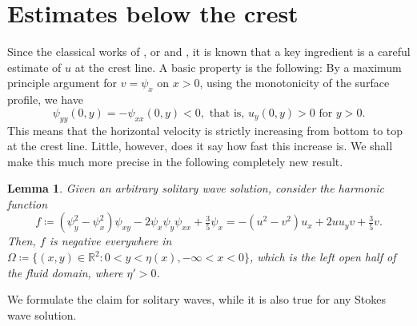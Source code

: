 \documentclass{amsart}
\newtheorem{lemma}[theorem]{Lemma}
\theoremstyle{definition}
\newcommand{\R}{\mathbb R}
\begin{document}
\section{Estimates below the crest}\label{sec:slope}
Since the classical works of \cite{Starr47}, or \cite{kp} and \cite{Long56}, it is known that a key ingredient is a careful estimate of $u$ at the crest line. A basic property is the following: By a maximum principle argument for $v=\psi_x$ on $x>0$, using the monotonicity of the surface profile, we have
\[\psi_{yy}(0,y) = -\psi_{xx}(0,y)<0,\text{ that is, }u_y(0,y)>0\text{ for }y>0.\]
This means that the horizontal velocity is strictly increasing from bottom to top at the crest line. Little, however, does it say how fast this increase is. We shall make this much more precise in the following completely new result.

\begin{lemma} \label{thm:slope}
	Given an arbitrary solitary wave solution, consider the harmonic function 
	\[
	f \coloneqq (\psi_y^2-\psi_x^2)\psi_{xy}-2\psi_x\psi_y\psi_{xx}+\tfrac35\psi_x = -(u^2-v^2)u_x+2u u_y v+\tfrac35v.
	\]
	Then, $f$ is negative everywhere in $\Omega\coloneqq\{(x,y)\in\R^2:0<y<\eta(x),-\infty<x<0\}$, which is the left open half of the fluid domain, where $\eta' > 0$.
\end{lemma}

We formulate the claim for solitary waves, while it is also true for any Stokes wave solution.
\end{document}
